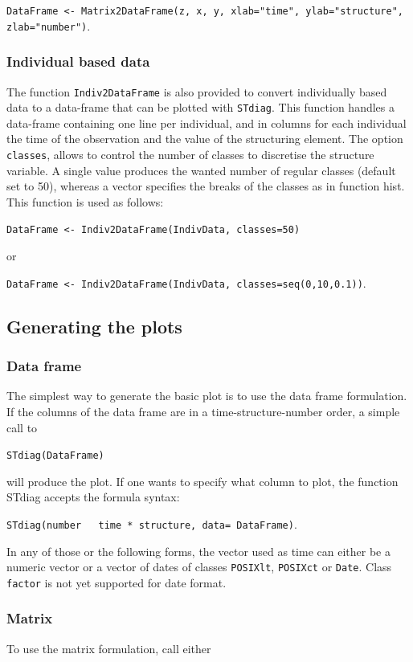 \texttt{DataFrame <- Matrix2DataFrame(z, x, y, xlab="time", ylab="structure",
zlab="number")}.

\subsubsection{Individual based data}
The function \texttt{Indiv2DataFrame} is also provided to convert individually
based data to a data-frame that can be plotted with \texttt{STdiag}. This
function handles a data-frame containing one line per individual, and in columns for each
individual the time of the observation and the value of the structuring element.
The option \texttt{classes}, allows to control the number of classes to
discretise the structure variable. A single value produces the wanted number of regular classes
(default set to 50), whereas a vector specifies the breaks of the classes as in
function hist. This function is used as follows:

\texttt{DataFrame <- Indiv2DataFrame(IndivData, classes=50)}

or 

\texttt{DataFrame <- Indiv2DataFrame(IndivData, classes=seq(0,10,0.1))}.

\subsection{Generating the plots}

\subsubsection{Data frame}
The simplest way to generate the basic plot is to use the data frame
formulation. If the columns of the data frame are in a time-structure-number
order, a simple call to

\texttt{STdiag(DataFrame)}

will produce the plot. If one wants to specify what column to plot, the function
STdiag accepts the formula syntax:

\texttt{STdiag(number ~ time * structure, data= DataFrame)}.

In any of those or the following forms, the vector used as time can either be a
numeric vector or a vector of dates of classes \texttt{POSIXlt},
\texttt{POSIXct} or \texttt{Date}.
Class \texttt{factor} is not yet supported for date format.

\subsubsection{Matrix}
To use the matrix formulation, call either

